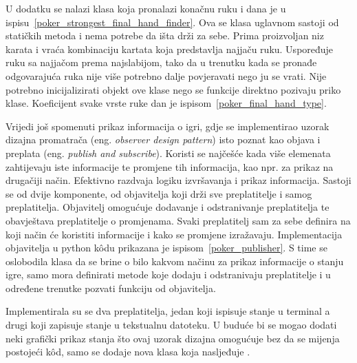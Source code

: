 U dodatku se nalazi klasa koja pronalazi konačnu ruku i dana je u ispisu~\ref{poker_strongest_final_hand_finder}. Ova se klasa uglavnom sastoji od statičkih metoda i nema potrebe da išta drži za sebe. Prima proizvoljan niz karata i vraća kombinaciju kartata koja predstavlja najjaču ruku. Uspoređuje ruku sa najjačom prema najslabijom, tako da u trenutku kada se pronađe odgovarajuća ruka nije više potrebno dalje povjeravati nego ju se vrati. Nije potrebno inicijalizirati objekt ove klase nego se funkcije direktno pozivaju priko klase. Koeficijent svake vrste ruke dan je ispisom~\ref{poker_final_hand_type}.


Vrijedi još spomenuti prikaz informacija o igri, gdje se implementirao uzorak dizajna promatrača (eng. \textit{observer design pattern}) isto poznat kao objava i preplata (eng. \textit{publish and subscribe}). Koristi se najčešće kada više elemenata zahtijevaju iste informacije te promjene tih informacija, kao npr. za prikaz na drugačiji način. Efektivno razdvaja logiku izvršavanja i prikaz informacija. Sastoji se od dvije komponente, od objavitelja koji drži sve preplatitelje i samog preplatitelja. Objavitelj omogućuje dodavanje i odstranivanje preplatitelja te obavještava preplatitelje o promjenama. Svaki preplatitelj sam za sebe definira na koji način će koristiti informacije i kako se promjene izražavaju. Implementacija objavitelja u python k\^odu prikazana je ispisom~\ref{poker_publisher}. S time se oslobodila klasa  da se brine o bilo kakvom načinu za prikaz informacije o stanju igre, samo mora definirati metode koje dodaju i odstranivaju preplatitelje i u određene trenutke pozvati  funkciju od objavitelja.


Implementirala su se dva preplatitelja, jedan koji ispisuje stanje u terminal a drugi koji zapisuje stanje u tekstualnu datoteku. U buduće bi se mogao dodati neki grafički prikaz stanja što ovaj uzorak dizajna omogućuje bez da se mijenja postojeći k\^od, samo se dodaje nova klasa koja nasljeđuje .

